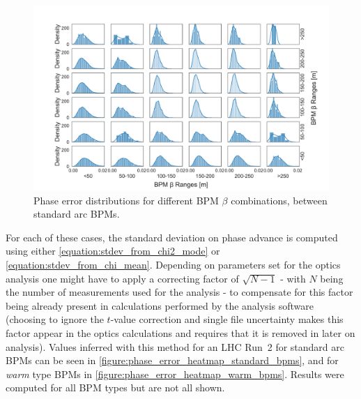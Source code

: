 \begin{figure}[!htb]
    \centering
    \includegraphics*[width=\textwidth]{Figures/Other_Studies/phase_grid_distributions_errors_standard_standard.pdf}
    \caption{Phase error distributions for different BPM \(\beta\) combinations, between standard arc BPMs.}
    \label{figure:grid_distributions_standard_standard}
\end{figure}

For each of these cases, the standard deviation on phase advance is computed using either \cref{equation:stdev_from_chi2_mode} or \cref{equation:stdev_from_chi_mean}.
Depending on parameters set for the optics analysis one might have to apply a correcting factor of \(\sqrt{N-1}\) - with \(N\) being the number of measurements used for the analysis - to compensate for this factor being already present in calculations performed by the analysis software (choosing to ignore the \(t\)-value correction and single file uncertainty makes this factor appear in the optics calculations and requires that it is removed in later on analysis).
Values inferred with this method for an LHC Run~\num{2} for standard arc BPMs can be seen in \cref{figure:phase_error_heatmap_standard_bpms}, and for \textit{warm} type BPMs in \cref{figure:phase_error_heatmap_warm_bpms}.
Results were computed for all BPM types but are not all shown.

